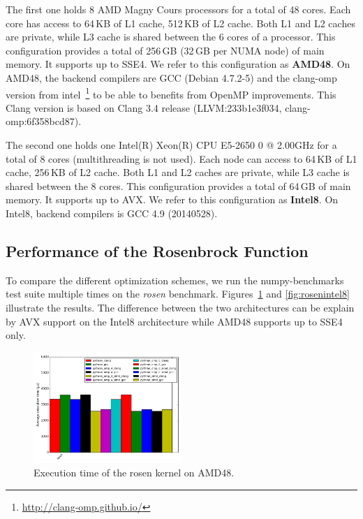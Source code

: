 \documentclass[10pt, preprint]{sigplanconf}
\begin{document}
The first one holds 8 AMD Magny Cours processors for a
total of 48 cores. Each core has access to 64\,KB of L1 cache,
512\,KB of L2 cache. Both L1 and L2 caches are private, while L3 cache
is shared between the 6 cores of a processor. This configuration
provides a total of 256\,GB (32\,GB per NUMA node) of main memory. It supports
up to SSE4. We refer to this configuration as \textbf{AMD48}.
On AMD48, the backend compilers are GCC (Debian 4.7.2-5) and the clang-omp
version from intel~\footnote{\url{http://clang-omp.github.io/}} to be able to
benefits from OpenMP improvements. This Clang version is based on Clang 3.4
release (LLVM:233b1e3f034, clang-omp:6f358bcd87).


The second one holds one Intel(R) Xeon(R) CPU E5-2650 0 @ 2.00GHz for a total of
8 cores (multithreading is not used). Each node can access to 64\,KB of L1
cache, 256\,KB of L2 cache. Both L1 and L2 caches are private, while L3 cache
is shared between the 8 cores. This configuration provides a total of 64\,GB of 
main memory. It supports up to AVX. We refer to this configuration as
\textbf{Intel8}.
On Intel8, backend compilers is GCC 4.9 (20140528).


\subsection{Performance of the Rosenbrock Function}

To compare the different optimization schemes, we run the numpy-benchmarks test
suite multiple times on the \textit{rosen} benchmark.
Figures~\ref{fig:rosenamd48} and \ref{fig:rosenintel8} illustrate the results.
The difference between the two architectures can be explain by AVX support on
the Intel8 architecture while AMD48 supports up to SSE4 only.

\begin{figure}[t]
\centering
\includegraphics[width=0.5\textwidth]{rosen_amd48.png}
\caption{Execution time of the rosen kernel on AMD48.}
\label{fig:rosenamd48}
\end{figure}
\end{document}
